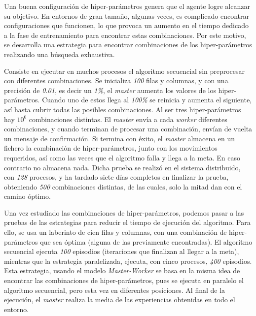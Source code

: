
Una buena configuración de hiper-parámetros genera que el agente logre alcanzar su objetivo. En entornos de gran tamaño, algunas veces, es complicado encontrar configuraciones que funcionen, lo que provoca un aumento en el tiempo dedicado a la fase de entrenamiento para encontrar estas combinaciones. Por este motivo, se desarrolla una estrategia para encontrar combinaciones de los hiper-parámetros realizando una búsqueda exhaustiva. 

Consiste en ejecutar en muchos procesos el algoritmo secuencial sin preprocesar con diferentes combinaciones. Se inicializa \textit{100} filas y columnas, y con una precisión de \textit{0.01}, es decir un \textit{1\%}, el \textit{master} aumenta los valores de los hiper-parámetros. Cuando uno de estos llega al \textit{100\%} se reinicia y aumenta el siguiente, así hasta cubrir todas las posibles combinaciones. Al ser tres hiper-parámetros hay \(10^{6}\) combinaciones distintas. El \textit{master} envía a cada \textit{worker} diferentes combinaciones, y cuando terminan de procesar una combinación, envían de vuelta un mensaje de confirmación. Si termina con éxito, el \textit{master} almacena en un fichero la combinación de hiper-parámetros, junto con los movimientos requeridos, así como las veces que el algoritmo falla y llega a la meta. En caso contrario no almacena nada. Dicha prueba se realizó en el sistema distribuido, con \textit{128} procesos, y ha tardado siete días completos en finalizar la prueba, obteniendo \textit{500} combinaciones distintas, de las cuales, solo la mitad dan con el camino óptimo.






Una vez estudiado las combinaciones de hiper-parámetros, podemos pasar a las pruebas de las estrategias para reducir el tiempo de ejecución del algoritmo. Para ello, se usa un laberinto de cien filas y columnas, con una combinación de hiper-parámetros que sea óptima (alguna de las previamente encontradas). El algoritmo secuencial ejecuta \textit{100} episodios (iteraciones que finalizan al llegar a la meta), mientras que la estrategia paralelizada, ejecuta, con cinco procesos, \textit{400} episodios. Esta estrategia, usando el modelo \textit{Master-Worker} se basa en la misma idea de encontrar las combinaciones de hiper-parámetros, pues se ejecuta en paralelo el algoritmo secuencial, pero esta vez en diferentes posiciones. Al final de la ejecución, el \textit{master} realiza la media de las experiencias obtenidas en todo el entorno. 

